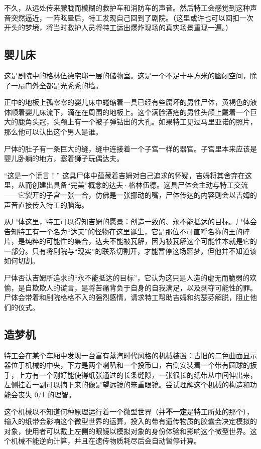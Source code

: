 不久，从远处传来朦胧而模糊的救护车和消防车的声音。然后特工会感觉到这种声音突然逼近，一阵眩晕后，特工发现自己回到了剧院。（这里或许也可以回扣一次开头的梦境，将当时救护人员将特工运出爆炸现场的真实场景重现一遍。）

\subsection{婴儿床}
这是剧院中的格林伍德宅邸一层的储物室。这是一个不足十平方米的幽闭空间，除了一扇门外全都是光秃秃的墙。

正中的地板上孤零零的婴儿床中蜷缩着一具已经有些腐坏的男性尸体，黄褐色的液体顺着婴儿床流下，滴在在周围的地板上。这个满脸酒疮的男性头颅上戴着一个巨大的鹿角头冠，头颅上有一个被子弹钻出的大孔。如果特工见过马里亚诺的照片，那么他可以认出这个男人是谁。

尸体的肚子有一条巨大的缝，缝中连接着一个子宫一样的器官。子宫里本来应该是婴儿卧躺的地方，塞着狮子玩偶达夫。

“这是一个谎言！” 这具尸体中蕴藏着吉姆对自己追求的怀疑，吉姆将其舍弃在这里，从而创建出具备“完美”概念的达夫·格林伍德。这具尸体会主动与特工交流——它裂开的子宫一张一合，仿佛是一张挪动的嘴，尸体传达的内容则会以吉姆的声音直接传入特工的脑海。

从尸体这里，特工可以得知吉姆的愿景：创造一致的、永不能抵达的目标。尸体会告知特工有一个名为“达夫”的怪物在这里诞生，它是那位不可直呼名称的王的碎片，是纯粹的可能性的集合，达夫不能被瓦解，因为被瓦解这个可能性本就是它的一部分。只有将剧院与“现实”的联系切割开，才能暂停这场噩梦，但他并不知道该如何切割。

尸体否认吉姆所追求的“永不能抵达的目标”，它认为这只是人造的虚无而脆弱的欢愉，是自欺欺人的谎言，是将苦痛背负于自身的自我满足，以及剥夺可能性的罪。尸体会带着和剧院格格不入的强烈感情，请求特工帮助吉姆和约瑟芬解脱，阻止他们的仪式。

\subsection{造梦机}
特工会在某个车厢中发现一台富有蒸汽时代风格的机械装置：古旧的二色曲面显示器位于机械的中央，下方是两个喇叭和一个投币口，右侧安装着一个带有圆球的扳手，上方有一个刚好能使得纸张通过的长条缝隙，一张很长的纸带从中间伸出来，左侧挂着一副可以摘下来的像是望远镜的笨重眼镜。尝试理解这个机械的构造和功能会丧失 0/1 的理智。

这个机械以不知道何种原理运行着一个微型世界（并\textbf{不一定}是特工所处的那个），输入的纸带会影响这个微型世界的运算，投入的带有遗传物质的胶囊会决定模拟的对象，使用者可以戴上左侧的眼镜以模拟对象的身份体验和影响这个微型世界。这个机械不能逆向计算，并且在遗传物质耗尽后会自动暂停计算。


